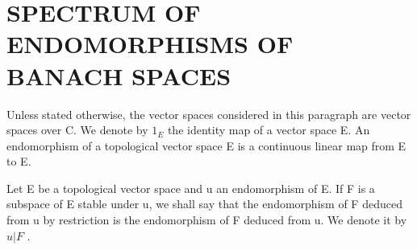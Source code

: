\section{SPECTRUM OF ENDOMORPHISMS OF BANACH SPACES}

Unless stated otherwise, the vector spaces considered in this paragraph are vector spaces over C. We denote by \(1_{E}\) the identity map of a vector space E. An endomorphism of a topological vector space E is a continuous linear map from E to E.

Let E be a topological vector space and u an endomorphism of E. If F is a subspace of E stable under u, we shall say that the endomorphism of F deduced from u by restriction is the endomorphism of F deduced from u. We denote it by \(u|F\) .

